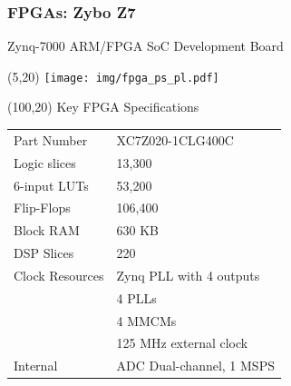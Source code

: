 \documentclass[aspectratio=169]{beamer}
\begin{document}
\begin{frame}[fragile,t]
    \frametitle{FPGAs: Zybo Z7}
    \textcolor{verdeuca}{Zynq-7000 ARM/FPGA SoC Development Board}\\
    \begin{textblock}{75}(5,20)
    \texttt{[image: img/fpga\_ps\_pl.pdf]}
    \end{textblock}
    \begin{textblock}{85}(100,20)
    \vspace{0.2cm}
    \small Key FPGA Specifications\\
    \vspace{0.2cm}
    \scriptsize
    \begin{tabular}{ll}
    Part Number & XC7Z020-1CLG400C\\
    Logic slices & 13,300\\
    6-input LUTs & 53,200\\
    Flip-Flops & 106,400\\
    Block RAM & 630 KB\\
    DSP Slices & 220\\
    Clock Resources & Zynq PLL with 4 outputs\\
    & 4 PLLs\\
    & 4 MMCMs\\
    & 125 MHz external clock\\
    Internal & ADC Dual-channel, 1 MSPS\\
    \end{tabular}\\
    \end{textblock}
\end{frame}
\end{document}
